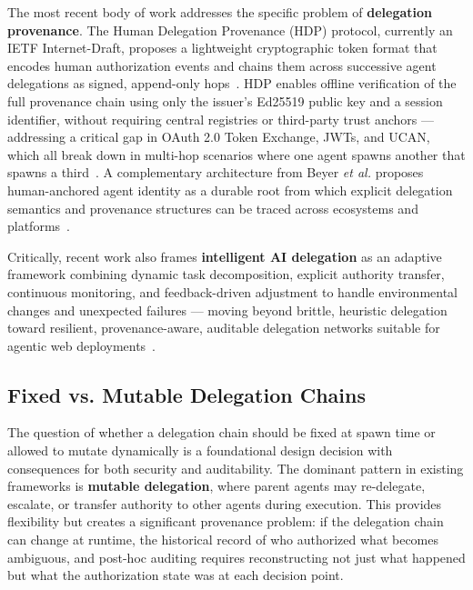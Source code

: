 The most recent body of work addresses the specific problem of \textbf{delegation provenance}. The Human Delegation Provenance (HDP) protocol, currently an IETF Internet-Draft, proposes a lightweight cryptographic token format that encodes human authorization events and chains them across successive agent delegations as signed, append-only hops~\cite{hdp-protocol}. HDP enables offline verification of the full provenance chain using only the issuer's Ed25519 public key and a session identifier, without requiring central registries or third-party trust anchors — addressing a critical gap in OAuth 2.0 Token Exchange, JWTs, and UCAN, which all break down in multi-hop scenarios where one agent spawns another that spawns a third~\cite{multihop-delegation}. A complementary architecture from Beyer \textit{et al.} proposes human-anchored agent identity as a durable root from which explicit delegation semantics and provenance structures can be traced across ecosystems and platforms~\cite{agent-identity-architecture}.

Critically, recent work also frames \textbf{intelligent AI delegation} as an adaptive framework combining dynamic task decomposition, explicit authority transfer, continuous monitoring, and feedback-driven adjustment to handle environmental changes and unexpected failures — moving beyond brittle, heuristic delegation toward resilient, provenance-aware, auditable delegation networks suitable for agentic web deployments~\cite{intelligent-delegation}.

\subsection{Fixed vs. Mutable Delegation Chains}

The question of whether a delegation chain should be fixed at spawn time or allowed to mutate dynamically is a foundational design decision with consequences for both security and auditability. The dominant pattern in existing frameworks is \textbf{mutable delegation}, where parent agents may re-delegate, escalate, or transfer authority to other agents during execution. This provides flexibility but creates a significant provenance problem: if the delegation chain can change at runtime, the historical record of who authorized what becomes ambiguous, and post-hoc auditing requires reconstructing not just what happened but what the authorization state was at each decision point.

